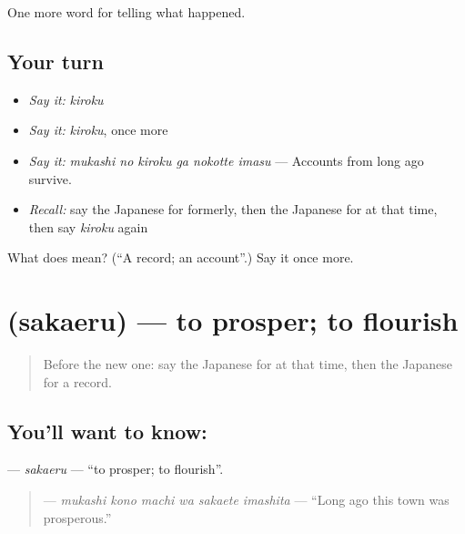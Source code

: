 \begin{grammarlens}[title={What you've built}]
One more word for telling what happened.
\end{grammarlens}

\subsection*{Your turn}
\begin{itemize}
\raggedright
  \item \emph{Say it:} \emph{kiroku}
  \item \emph{Say it:} \emph{kiroku}, once more
  \item \emph{Say it:} \emph{mukashi no kiroku ga nokotte imasu} — Accounts from long ago survive.
  \item \emph{Recall:} say the Japanese for formerly, then the Japanese for at that time, then say \emph{kiroku} again
\end{itemize}

\begin{tcolorbox}[breakable,colback=teal!4,colframe=teal!35!black,title={Before you move on}]
What does  mean? (\textquotedblleft{}A record; an account\textquotedblright{}.) Say it once more.
\end{tcolorbox}
\section[\texorpdfstring{\ja{さかえる} (sakaeru)}{さかえる (sakaeru)}]{ (sakaeru) — to prosper; to flourish}

\label{lesson:JA-C313-sakaeru}



\begin{quote}
Before the new one: say the Japanese for at that time, then the Japanese for a record.
\end{quote}

\subsection*{You'll want to know: }
\textbf{} — \emph{sakaeru} — \textquotedblleft{}to prosper; to flourish\textquotedblright{}.

\begin{quote}
\textbf{   } — \emph{mukashi kono machi wa sakaete imashita} — \textquotedblleft{}Long ago this town was prosperous.\textquotedblright{}
\end{quote}

